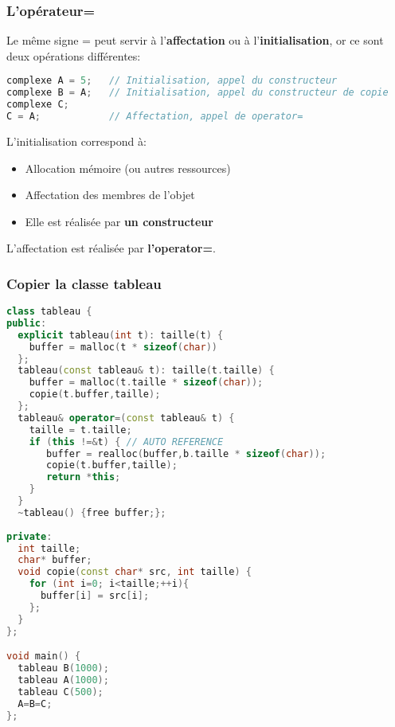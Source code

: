 \documentclass{beamer}
\begin{document}
\begin{frame}[fragile=singleslide,shrink=20]
\frametitle {L'opérateur=}

Le même signe = peut servir à l'\textbf{affectation} ou à l'\textbf{initialisation}, or ce sont deux opérations différentes:
\begin{lstlisting}[language=c++]
complexe A = 5;   // Initialisation, appel du constructeur
complexe B = A;   // Initialisation, appel du constructeur de copie
complexe C; 
C = A;            // Affectation, appel de operator=
\end{lstlisting}

L'initialisation correspond à:
\begin{itemize}
\item{Allocation mémoire (ou autres ressources)}
\item{Affectation des membres de l'objet}
\item{Elle est réalisée par \textbf{un constructeur}}
\end{itemize}

L'affectation est réalisée par \textbf{l'operator=}.
\end{frame}

\begin{frame}[fragile=singleslide,shrink=20]
\frametitle {Copier la classe tableau}
\begin{lstlisting}[language=c++]
class tableau {
public:
  explicit tableau(int t): taille(t) {
    buffer = malloc(t * sizeof(char))
  };
  tableau(const tableau& t): taille(t.taille) {
    buffer = malloc(t.taille * sizeof(char));
    copie(t.buffer,taille);
  };
  tableau& operator=(const tableau& t) {
    taille = t.taille;
    if (this !=&t) { // AUTO REFERENCE
       buffer = realloc(buffer,b.taille * sizeof(char));
       copie(t.buffer,taille);
       return *this;
    }
  }
  ~tableau() {free buffer;};
  
private:
  int taille;
  char* buffer;
  void copie(const char* src, int taille) {
    for (int i=0; i<taille;++i){
      buffer[i] = src[i]; 
    };
  }
};

void main() {
  tableau B(1000);
  tableau A(1000);
  tableau C(500);
  A=B=C;
};
\end{lstlisting}
\end{frame}
\end{document}
